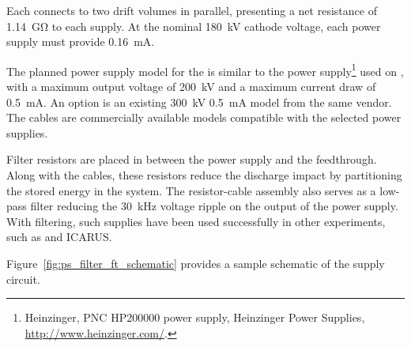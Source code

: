 Each  connects to two drift volumes in parallel, presenting a net resistance of \SI{1.14}{\giga\ohm} to each supply. At the nominal \SI{180}{kV} cathode voltage, each power supply must provide \SI{0.16}{mA}.

The planned power supply model for the  is similar to the power supply\footnote{Heinzinger, PNC HP200000  power supply, Heinzinger\texttrademark{} Power Supplies, \url{http://www.heinzinger.com/}.} used on , with a maximum output voltage of \SI{200}{kV} and a maximum current draw of \SI{0.5}{mA}.  An %
option is an existing \SI{300}{kV} \SI{0.5}{mA} model from the same vendor.
The  cables are commercially available models compatible with the selected power supplies. 


Filter resistors are placed in between the power supply and the feedthrough.  Along with the cables, these resistors reduce the discharge impact by partitioning the stored energy in the system.  The resistor-cable assembly also serves as a low-pass filter reducing the \SI{30}{kHz} voltage ripple on the output of the power supply.  With filtering, such supplies have been used successfully in other \lartpc experiments, such as \microboone and ICARUS.

Figure~\ref{fig:ps_filter_ft_schematic} provides a sample schematic of the  supply circuit.

